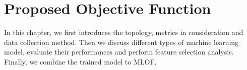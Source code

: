 \chapter{Proposed Objective Function}\label{C:ProposedOf}

In this chapter, we first introduces the topology, metrics in consideration and data collection method. Then we discuss different types of machine learning model, evaluate their performances and perform feature selection analysis. Finally, we combine the trained model to MLOF.








